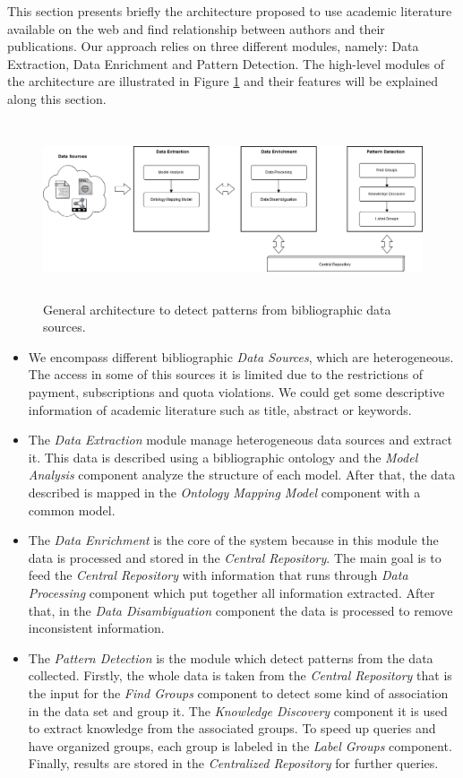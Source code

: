 \documentclass[11pt]{article}
\begin{document}
This section presents %
briefly the architecture proposed to use academic literature available on the web and find relationship between authors and their publications. Our approach relies on three different modules, namely: Data Extraction, Data Enrichment and Pattern Detection. The high-level modules of the architecture are illustrated in Figure \ref{fig:achitecture} and their features will be explained along this section.

 \begin{figure}[ht!]
	\centering 
		\includegraphics[height=5.2cm]{platformDiagram.png}
	\caption{General architecture to detect patterns from bibliographic data sources.}
	\label{fig:achitecture}
\end{figure}

\begin{itemize}
\item We encompass different bibliographic \emph{Data Sources}, which are heterogeneous. The access in some of this sources it is limited due to the restrictions of payment, subscriptions and quota violations. We could get some descriptive information of academic literature such as title, abstract or keywords.
\item The \emph{Data Extraction} module manage heterogeneous data sources and extract it. This data is described using a bibliographic ontology and  the \emph{Model Analysis} component analyze the structure of each model. After that, the data described is mapped in the \emph{Ontology Mapping Model} component with a common model.
\item The \emph{Data Enrichment} is the core of the system because in this module the data %
is processed and stored in the \emph{Central Repository}. The main goal 
is to feed the \emph{Central Repository} with information that runs through \emph{Data Processing} component which put together all information extracted. After that, in the  \emph{Data Disambiguation} component the data is processed to remove inconsistent information.
\item The \emph{Pattern Detection} is the module which detect patterns from the data collected. Firstly, the whole data is taken from the \emph{Central Repository}  that is the input for the \emph{Find Groups} component to detect some kind of association in the data set and group it. The \emph{Knowledge Discovery} component it is used to extract knowledge from the associated groups. To speed up queries and have organized groups, each group is labeled in the \emph{Label Groups} component. Finally, results are stored in the \emph{Centralized Repository} for further queries.
\end{itemize}
\end{document}
